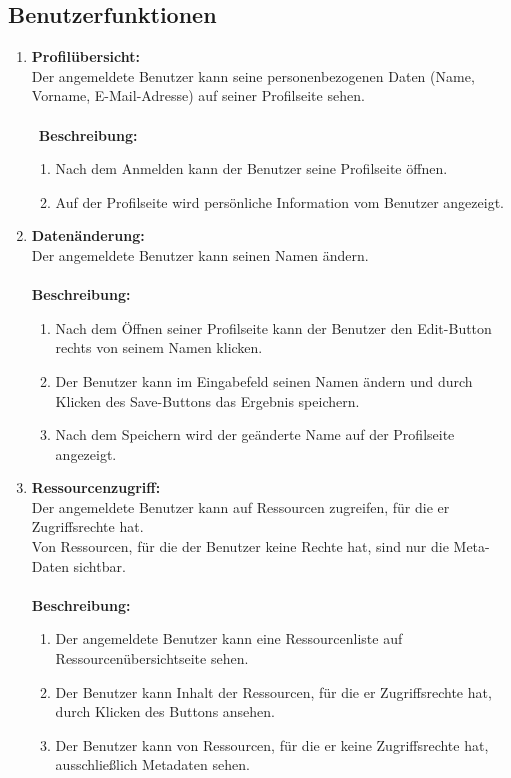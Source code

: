 \documentclass[parskip=full,11pt]{scrartcl}
\def\threedigits#1{%
  \ifnum#1<10 0\fi
  \ifnum#1<1 0\fi
  \number#1}
\begin{document}
\subsection{Benutzerfunktionen}
\begin{enumerate}[label={\textbf{/F\protect\threedigits{\theenumi}0/}}, leftmargin=*]
\item \label{FAB1} \textbf{Profilübersicht:} \\ Der angemeldete Benutzer kann seine personenbezogenen Daten (Name, Vorname, E-Mail-Adresse) auf seiner Profilseite sehen.\\\\\
\textbf{Beschreibung:}\\
\begin{enumerate}[label=(\arabic*), leftmargin=*]
\item Nach dem Anmelden kann der Benutzer seine Profilseite öffnen.
\item Auf der Profilseite wird persönliche Information vom Benutzer angezeigt.
\end{enumerate}

\item \label{FAB2} \textbf{Datenänderung:} \\ Der angemeldete Benutzer kann seinen Namen ändern.\\\\
\textbf{Beschreibung:}\\
\begin{enumerate}[label=(\arabic*), leftmargin=*]
\item Nach dem Öffnen seiner Profilseite kann der Benutzer den Edit-Button rechts von seinem Namen klicken.
\item Der Benutzer kann im Eingabefeld seinen Namen ändern und durch Klicken des Save-Buttons das Ergebnis speichern.
\item  Nach dem Speichern wird der geänderte Name auf der Profilseite angezeigt.
\end{enumerate}

\item \label{FAB3} \textbf{Ressourcenzugriff:} \\Der angemeldete Benutzer kann auf Ressourcen zugreifen, für die er Zugriffsrechte hat.
\\ Von Ressourcen, für die der Benutzer keine Rechte hat, sind nur die Meta-Daten sichtbar.\\\\
\textbf{Beschreibung:}\\
\begin{enumerate}[label=(\arabic*), leftmargin=*]
\item Der angemeldete Benutzer kann eine Ressourcenliste auf Ressourcenübersichtseite sehen.
\item Der Benutzer kann Inhalt der Ressourcen, für die er Zugriffsrechte hat, durch Klicken des Buttons \grqq \: ansehen.
\item Der Benutzer kann von Ressourcen, für die er keine Zugriffsrechte hat, ausschließlich Metadaten sehen.
\end{enumerate}


\end{enumerate}
\end{document}

